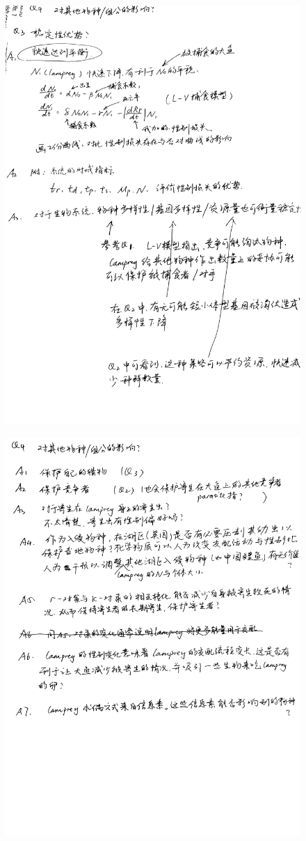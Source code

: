 \documentclass[11pt]{article}
\begin{document}
\begin{figure}[h]
    \includegraphics[height=\textheight]{3.jpg}
\end{figure}
\begin{figure}[h]
    \includegraphics[height=\textheight]{4.jpg}
\end{figure}
\end{document}
